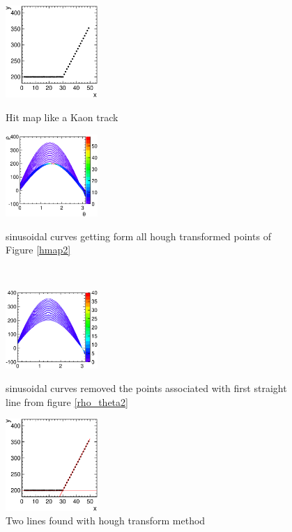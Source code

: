 \begin{figure}[!htb]
  \begin{minipage}{0.5\hsize}
    \begin{center}
      \includegraphics[width=35mm]{fig/hmap2.eps}
    \end{center}
    \caption{Hit map like a Kaon track}
    \label{hmap2}
  \end{minipage}
  \begin{minipage}{0.5\hsize}
    \begin{center}
      \includegraphics[width=35mm]{fig/rho_theta2.eps}
    \end{center}
    \caption{sinusoidal curves getting form all hough transformed  points of Figure \ref{hmap2}}
    \label{rho_theta2}
  \end{minipage}
  \\
  \begin{minipage}{0.5\hsize}
    \begin{center}
      \includegraphics[width=35mm]{fig/rho_theta_kink.eps}
    \end{center}
    \caption{sinusoidal curves removed the points associated with first straight line from figure \ref{rho_theta2}}
    \label{rho_theta3}
  \end{minipage}
  \begin{minipage}{0.5\hsize}
    \begin{center}
      \includegraphics[width=35mm]{fig/hmap_fit.eps}
    \end{center}
    \caption{Two lines found with hough transform method}
    \label{hmap_fit}
  \end{minipage}
\end{figure}


